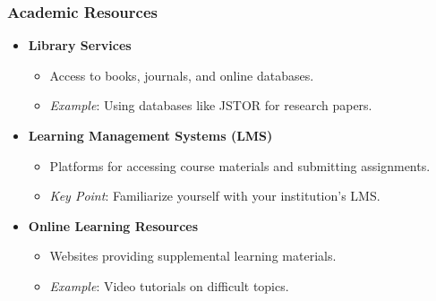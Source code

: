 \documentclass[aspectratio=169]{beamer}
\begin{document}
\begin{frame}[fragile]
    \frametitle{Academic Resources}
    \begin{itemize}
        \item \textbf{Library Services}
            \begin{itemize}
                \item Access to books, journals, and online databases.
                \item \textit{Example}: Using databases like JSTOR for research papers.
            \end{itemize}
        
        \item \textbf{Learning Management Systems (LMS)}
            \begin{itemize}
                \item Platforms for accessing course materials and submitting assignments.
                \item \textit{Key Point}: Familiarize yourself with your institution's LMS.
            \end{itemize}

        \item \textbf{Online Learning Resources}
            \begin{itemize}
                \item Websites providing supplemental learning materials.
                \item \textit{Example}: Video tutorials on difficult topics.
            \end{itemize}
    \end{itemize}
\end{frame}
\end{document}
